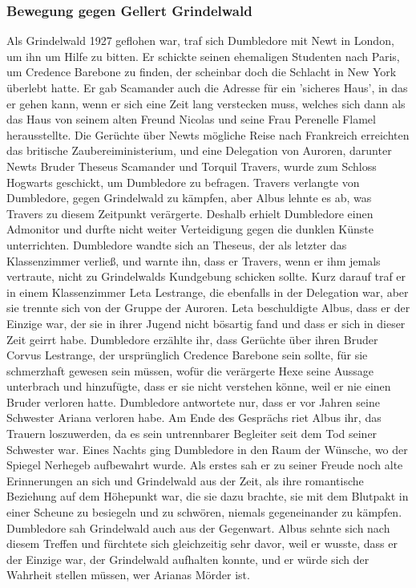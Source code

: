 \documentclass[a4paper, 10pt]{article}
\begin{document}
\subsubsection*{Bewegung gegen Gellert Grindelwald}
Als Grindelwald 1927 geflohen war, traf sich Dumbledore mit Newt in London, um ihn um Hilfe zu bitten. Er schickte seinen ehemaligen Studenten nach Paris, um Credence Barebone zu finden, der scheinbar doch die Schlacht in New York überlebt hatte. Er gab Scamander auch die Adresse für ein 'sicheres Haus', in das er gehen kann, wenn er sich eine Zeit lang verstecken muss, welches sich dann als das Haus von seinem alten Freund Nicolas und seine Frau Perenelle Flamel herausstellte.
\vspace{10pt}
\newline
Die Gerüchte über Newts mögliche Reise nach Frankreich erreichten das britische Zaubereiministerium, und eine Delegation von Auroren, darunter Newts Bruder Theseus Scamander und Torquil Travers, wurde zum Schloss Hogwarts geschickt, um Dumbledore zu befragen. Travers verlangte von Dumbledore, gegen Grindelwald zu kämpfen, aber Albus lehnte es ab, was Travers zu diesem Zeitpunkt verärgerte. Deshalb erhielt Dumbledore einen Admonitor und durfte nicht weiter Verteidigung gegen die dunklen Künste unterrichten. Dumbledore wandte sich an Theseus, der als letzter das Klassenzimmer verließ, und warnte ihn, dass er Travers, wenn er ihm jemals vertraute, nicht zu Grindelwalds Kundgebung schicken sollte.
\vspace{10pt}
\newline
Kurz darauf traf er in einem Klassenzimmer Leta Lestrange, die ebenfalls in der Delegation war, aber sie trennte sich von der Gruppe der Auroren. Leta beschuldigte Albus, dass er der Einzige war, der sie in ihrer Jugend nicht bösartig fand und dass er sich in dieser Zeit geirrt habe. Dumbledore erzählte ihr, dass Gerüchte über ihren Bruder Corvus Lestrange, der ursprünglich Credence Barebone sein sollte, für sie schmerzhaft gewesen sein müssen, wofür die verärgerte Hexe seine Aussage unterbrach und hinzufügte, dass er sie nicht verstehen könne, weil er nie einen Bruder verloren hatte. Dumbledore antwortete nur, dass er vor Jahren seine Schwester Ariana verloren habe. Am Ende des Gesprächs riet Albus ihr, das Trauern loszuwerden, da es sein untrennbarer Begleiter seit dem Tod seiner Schwester war.
\vspace{10pt}
\newline
Eines Nachts ging Dumbledore in den Raum der Wünsche, wo der Spiegel Nerhegeb aufbewahrt wurde. Als erstes sah er zu seiner Freude noch alte Erinnerungen an sich und Grindelwald aus der Zeit, als ihre romantische Beziehung auf dem Höhepunkt war, die sie dazu brachte, sie mit dem Blutpakt in einer Scheune zu besiegeln und zu schwören, niemals gegeneinander zu kämpfen. Dumbledore sah Grindelwald auch aus der Gegenwart. Albus sehnte sich nach diesem Treffen und fürchtete sich gleichzeitig sehr davor, weil er wusste, dass er der Einzige war, der Grindelwald aufhalten konnte, und er würde sich der Wahrheit stellen müssen, wer Arianas Mörder ist.
\end{document}
